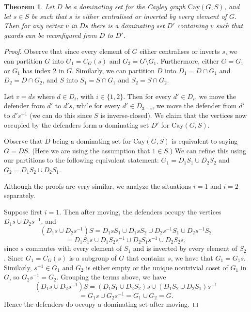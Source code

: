 \documentclass{amsart}
\newtheorem{thm}{Theorem}[section]
\theoremstyle{remark}
\theoremstyle{definition}
\newcommand{\Cay}[2]{\mathrm{Cay}(#1,#2)}		%
\begin{document}
\begin{thm}\label{abelian}
    Let $D$ be a dominating set for the Cayley graph $\Cay{G}{S}$, and let $s \in S$ be such that $s$ is either centralised or inverted by every element of $G$. Then for any vertex $v$ in $Ds$ there is a dominating set $D'$ containing $v$ such that guards can be reconfigured from $D$ to $D'$.
\end{thm}

\begin{proof}
    Observe that since every element of $G$ either centralises or inverts $s$, we can partition $G$ into $G_1=C_G(s)$ and $G_2=G \setminus G_1$. Furthermore, either $G=G_1$ or $G_1$ has index $2$ in $G$. Similarly, we can partition $D$ into $D_1=D\cap G_1$ and $D_2=D\cap G_2$, and $S$ into $S_1=S\cap G_1$ and $S_2=S\cap G_2$.

    Let $v=ds$ where $d \in D_i$, with $i \in \{1,2\}$. Then for every $d' \in D_i$, we move the defender from $d'$ to $d's$, while for every $d' \in D_{3-i}$, we move the defender from $d'$ to $d's^{-1}$ (we can do this since $S$ is inverse-closed). We claim that the vertices now occupied by the defenders form a dominating set $D'$ for $\Cay{G}{S}$.

    Observe that $D$ being a dominating set for $\Cay{G}{S}$ is equivalent to saying $G = DS$. (Here we are using the assumption that $1 \in S$.) We can refine this using our partitions to the following equivalent statement: $G_1=D_1S_1 \cup D_2S_2$ and $G_2=D_1S_2 \cup D_2S_1$.

    Although the proofs are very similar, we analyze the situations $i=1$ and $i=2$ separately. 

    Suppose first $i=1$. Then after moving, the defenders occupy the vertices $D_1s \cup D_2s^{-1}$, and $$(D_1s \cup D_2 s^{-1})S  = D_1sS_1 \cup D_1sS_2 \cup D_2s^{-1}S_1 \cup D_2s^{-1}S_2 $$
    $$ = D_1S_1s \cup D_1S_2s^{-1} \cup D_2S_1s^{-1}\cup D_2S_2s,$$ since $s$ commutes with every element of $S_1$ and is inverted by every element of $S_2$. Since $G_1 = C_G(s)$ is a subgroup of $G$ that contains $s$, we have that $G_1 = G_1s$. Similarly, $s^{-1}\in G_1$ and $G_2$ is either empty or the unique nontrivial coset of $G_1$ in $G$, so $G_2s^{-1}=G_2$. Grouping the terms above, we have 
    $$(D_1s\cup D_2s^{-1})S = (D_1S_1\cup D_2S_2)s \cup (D_1S_2\cup D_2S_1)s^{-1}$$
    $$ = G_1s\cup G_2s^{-1} = G_1\cup G_2 = G.$$
    Hence the defenders do occupy a dominating set after moving.
    

\end{proof}
\end{document}
